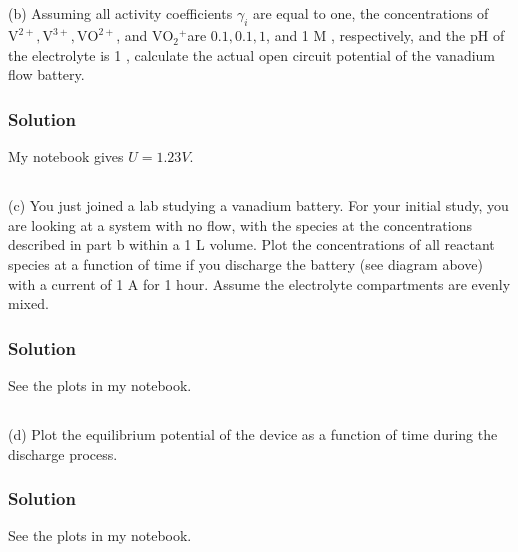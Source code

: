 \documentclass[12pt]{article}
\begin{document}
\subsection{}
(b) Assuming all activity coefficients $\gamma_{i}$ are equal to one, the concentrations of $\mathrm{V}^{2+}, \mathrm{V}^{3+}, \mathrm{VO}^{2+}$, and $\mathrm{VO}_{2}{ }^{+}$are $0.1,0.1,1$, and 1 M , respectively, and the pH of the electrolyte is 1 , calculate the actual open circuit potential of the vanadium flow battery.\\
\subsubsection{Solution}
My notebook gives $U =1.23 V$.
\subsection{}
(c) You just joined a lab studying a vanadium battery. For your initial study, you are looking at a system with no flow, with the species at the concentrations described in part b within a 1 L volume. Plot the concentrations of all reactant species at a function of time if you discharge the battery (see diagram above) with a current of 1 A for 1 hour. Assume the electrolyte compartments are evenly mixed.\\
\subsubsection{Solution}
See the plots in my notebook.
\subsection{}
(d) Plot the equilibrium potential of the device as a function of time during the discharge process.
\subsubsection{Solution}
See the plots in my notebook.
\end{document}
